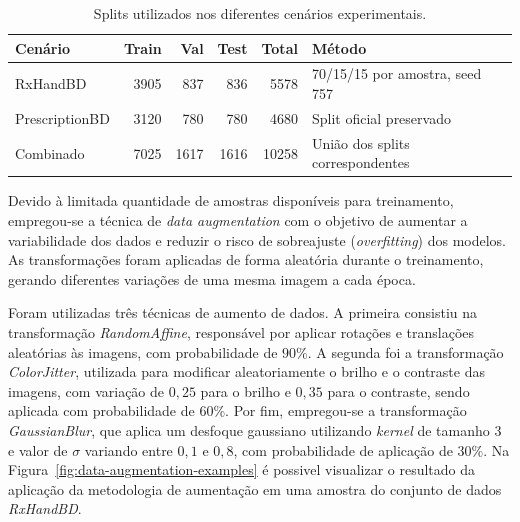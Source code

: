 \documentclass[11pt,a4paper]{article}
\begin{document}
\begin{table}[htbp]
	\centering
	\caption{Splits utilizados nos diferentes cenários experimentais.}
	\label{tab:splits}
	\begin{tabular}{lrrrrl}
		\toprule
		\textbf{Cenário} & \textbf{Train} & \textbf{Val} & \textbf{Test} & \textbf{Total} & \textbf{Método} \\
		\midrule
		RxHandBD       & 3905 & 837  & 836  & 5578  & 70/15/15 por amostra, seed 757 \\
		PrescriptionBD & 3120 & 780  & 780  & 4680  & Split oficial preservado \\
		Combinado      & 7025 & 1617 & 1616 & 10258 & União dos splits correspondentes \\
		\bottomrule
	\end{tabular}
\end{table}


Devido à limitada quantidade de amostras disponíveis para treinamento, empregou-se a técnica de \textit{data augmentation} com o objetivo de aumentar a variabilidade dos dados e reduzir o risco de sobreajuste (\textit{overfitting}) dos modelos. As transformações foram aplicadas de forma aleatória durante o treinamento, gerando diferentes variações de uma mesma imagem a cada época.

Foram utilizadas três técnicas de aumento de dados. A primeira consistiu na transformação \textit{RandomAffine}, responsável por aplicar rotações e translações aleatórias às imagens, com probabilidade de $90\%$. A segunda foi a transformação \textit{ColorJitter}, utilizada para modificar aleatoriamente o brilho e o contraste das imagens, com variação de $0{,}25$ para o brilho e $0{,}35$ para o contraste, sendo aplicada com probabilidade de $60\%$. Por fim, empregou-se a transformação \textit{GaussianBlur}, que aplica um desfoque gaussiano utilizando \textit{kernel} de tamanho 3 e valor de $\sigma$ variando entre $0{,}1$ e $0{,}8$, com probabilidade de aplicação de $30\%$. Na Figura~\ref{fig:data-augmentation-examples} é possivel visualizar o resultado da aplicação da metodologia de aumentação em uma amostra do conjunto de dados \textit{RxHandBD}.
\end{document}
